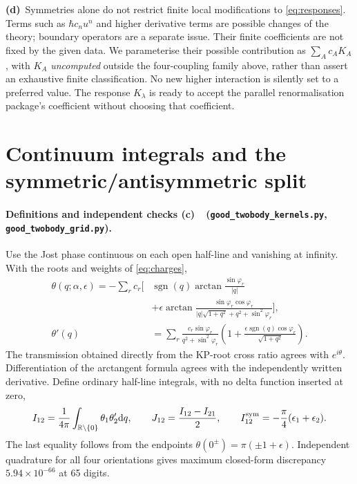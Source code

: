 \documentclass[11pt,a4paper]{article}
\newcommand{\Cc}{\textbf{(c)}\ }
\newcommand{\Cd}{\textbf{(d)}\ }
\newcommand{\dd}{\mathrm d}
\newcommand{\file}[1]{\nolinkurl{#1}}
\newcommand{\kernels}{\file{good_twobody_kernels.py}}
\newcommand{\grid}{\file{good_twobody_grid.py}}
\begin{document}
\Cd Symmetries alone do not restrict finite local modifications to
\eqref{eq:responses}. Terms such as \(\hbar c_nu^n\) and higher
derivative terms are possible changes of the theory; boundary operators
are a separate issue. Their finite coefficients are not fixed by the
given data. We parameterise their possible contribution as
\(\sum_A c_AK_A\), with \(K_A\) \emph{uncomputed} outside the
four-coupling family above, rather than assert an exhaustive finite
classification. No new higher interaction is silently set to a preferred
value. The response \(K_\lambda\) is ready to accept the parallel
renormalisation package's coefficient without choosing that coefficient.

\section{Continuum integrals and the symmetric/antisymmetric split}
\paragraph{Definitions and independent checks \Cc\ (\kernels, \grid).}
Use the Jost phase continuous on each open half-line and vanishing at
infinity. With the roots and weights of \eqref{eq:charges},
\begin{align}
 \theta(q;\alpha,\epsilon)=-\sum_r c_r\bigg[&
 \operatorname{sgn}(q)\arctan\frac{\sin\varphi_r}{|q|}\\[-1ex]
 &+\epsilon\arctan\frac{\sin\varphi_r\cos\varphi_r}
 {|q|\sqrt{1+q^2}+q^2+\sin^2\varphi_r}\bigg],\nonumber\\
 \theta'(q)&=\sum_r\frac{c_r\sin\varphi_r}{q^2+\sin^2\varphi_r}
 \left(1+\frac{\epsilon\operatorname{sgn}(q)\cos\varphi_r}{\sqrt{1+q^2}}\right).
\end{align}
The transmission obtained directly from the KP-root cross ratio agrees
with \(e^{i\theta}\). Differentiation of the arctangent formula agrees
with the independently written derivative. Define ordinary half-line
integrals, with no delta function inserted at zero,
\begin{equation}
 I_{12}=\frac1{4\pi}\int_{\mathbb R\setminus\{0\}}
       \theta_1\theta'_2\dd q,\qquad
 J_{12}=\frac{I_{12}-I_{21}}2,\qquad
 I_{12}^{\rm sym}=-\frac\pi4(\epsilon_1+\epsilon_2).
 \label{eq:integrals}
\end{equation}
The last equality follows from the endpoints
\(\theta(0^\pm)=\pi(\pm1+\epsilon)\). Independent quadrature for
all four orientations gives maximum closed-form discrepancy
\(5.94\times10^{-66}\) at 65 digits.
\end{document}
